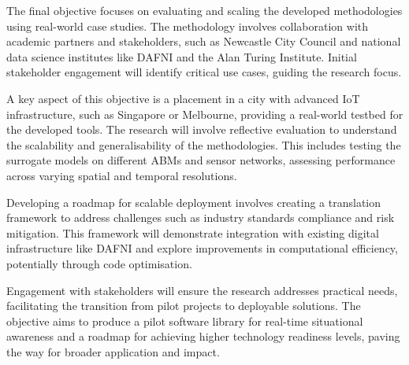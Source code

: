 The final objective focuses on evaluating and scaling the developed methodologies using real-world case studies. The methodology involves collaboration with academic partners and stakeholders, such as Newcastle City Council and national data science institutes like DAFNI and the Alan Turing Institute. Initial stakeholder engagement will identify critical use cases, guiding the research focus.

A key aspect of this objective is a placement in a city with advanced IoT infrastructure, such as Singapore or Melbourne, providing a real-world testbed for the developed tools. The research will involve reflective evaluation to understand the scalability and generalisability of the methodologies. This includes testing the surrogate models on different ABMs and sensor networks, assessing performance across varying spatial and temporal resolutions.

Developing a roadmap for scalable deployment involves creating a translation framework to address challenges such as industry standards compliance and risk mitigation. This framework will demonstrate integration with existing digital infrastructure like DAFNI and explore improvements in computational efficiency, potentially through code optimisation.

Engagement with stakeholders will ensure the research addresses practical needs, facilitating the transition from pilot projects to deployable solutions. The objective aims to produce a pilot software library for real-time situational awareness and a roadmap for achieving higher technology readiness levels, paving the way for broader application and impact.
